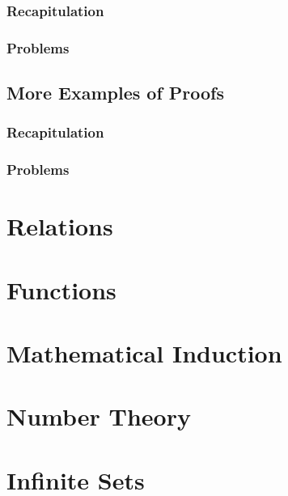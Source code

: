 \documentclass{report}
\begin{document}
        \subsection{Recapitulation}
        \subsection{Problems}
    \section{More Examples of Proofs}
        \subsection{Recapitulation}
        \subsection{Problems}

\chapter{Relations}

\chapter{Functions}

\chapter{Mathematical Induction}

\chapter{Number Theory}

\chapter{Infinite Sets}
\end{document}
